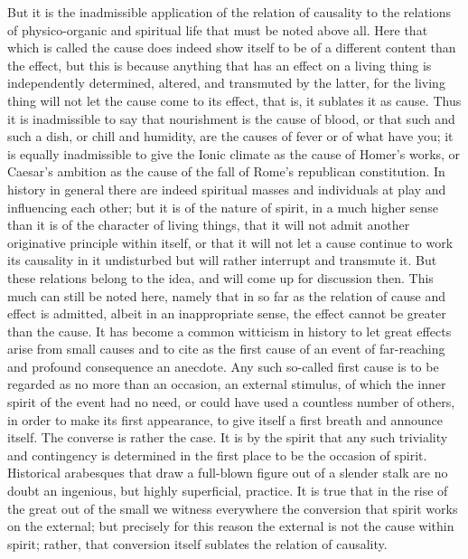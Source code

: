 But it is the inadmissible application of
the relation of causality to the relations of
physico-organic and spiritual life that must be noted above all.
Here that which is called the cause does indeed show itself
to be of a different content than the effect,
but this is because anything that has an effect on
a living thing is independently determined,
altered, and transmuted by the latter,
for the living thing will not let
the cause come to its effect,
that is, it sublates it as cause.
Thus it is inadmissible to say that
nourishment is the cause of blood,
or that such and such a dish, or chill and humidity,
are the causes of fever or of what have you;
it is equally inadmissible to give the Ionic climate
as the cause of Homer's works,
or Caesar's ambition as the cause of
the fall of Rome's republican constitution.
In history in general there are indeed
spiritual masses and individuals
at play and influencing each other;
but it is of the nature of spirit,
in a much higher sense than it is of
the character of living things,
that it will not admit another
originative principle within itself,
or that it will not let a cause
continue to work its causality in it undisturbed
but will rather interrupt and transmute it.
But these relations belong to the idea,
and will come up for discussion then.
This much can still be noted here,
namely that in so far as the relation of cause
and effect is admitted,
albeit in an inappropriate sense,
the effect cannot be greater than the cause.
It has become a common witticism in history
to let great effects arise from small causes
and to cite as the first cause of an event
of far-reaching and profound consequence an anecdote.
Any such so-called first cause is to be regarded
as no more than an occasion, an external stimulus,
of which the inner spirit of the event had no need,
or could have used a countless number of others,
in order to make its first appearance,
to give itself a first breath and announce itself.
The converse is rather the case.
It is by the spirit that any such
triviality and contingency is determined
in the first place to be the occasion of spirit.
Historical arabesques that draw a full-blown figure
out of a slender stalk are no doubt an ingenious,
but highly superficial, practice.
It is true that in the rise of the great out of the small
we witness everywhere the conversion
that spirit works on the external;
but precisely for this reason
the external is not the cause within spirit;
rather, that conversion itself sublates the relation of causality.

